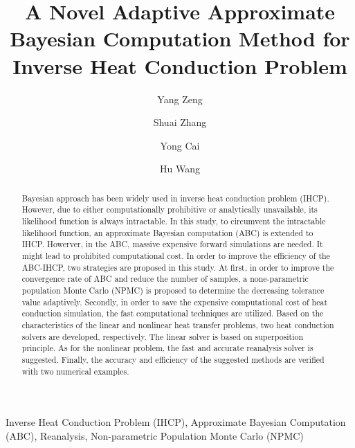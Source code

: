 \documentclass[review]{elsarticle}
\begin{document}
\begin{frontmatter}

\title{A Novel Adaptive Approximate Bayesian Computation Method for Inverse Heat Conduction Problem}

\author[mymainaddress,mysecondaryaddress]{Yang Zeng}

\author[mymainaddress,mysecondaryaddress]{Shuai Zhang}

\author[mymainaddress,mysecondaryaddress]{Yong Cai}

\author[mysecondaryaddress]{Hu Wang}

\address[mymainaddress]{College of Mechanical and Vehicle engineering, Hunan University}
\address[mysecondaryaddress]{State Key Laboratory of Advanced Design and Manufacturing for Vehicle Body}

\begin{abstract}
Bayesian approach has been widely used in inverse heat conduction problem (IHCP). However, due to either computationally prohibitive or analytically unavailable, its likelihood function is always intractable. In this study, to circumvent the intractable likelihood function, an approximate Bayesian computation (ABC) is extended to IHCP. Howerver, in the ABC, massive expensive forward simulations are needed. It might lead to prohibited computational cost. In order to improve the efficiency of the ABC-IHCP, two strategies are proposed in this study. At first, in order to improve the convergence rate of ABC and reduce the number of samples, a none-parametric population Monte Carlo (NPMC) is proposed to determine the decreasing tolerance value adaptively. Secondly, in order to save the expensive computational cost of heat conduction simulation, the fast computational techniques are utilized. Based on the characteristics of the linear and nonlinear heat transfer problems, two heat conduction solvers are developed, respectively. The linear solver is based on superposition principle. As for the nonlinear problem, the fast and accurate reanalysis solver is suggested. Finally, the accuracy and efficiency of the suggested methods are verified with two numerical examples.
\end{abstract}

\begin{keyword}
Inverse Heat Conduction Problem (IHCP), Approximate Bayesian Computation (ABC), Reanalysis, Non-parametric Population Monte Carlo (NPMC)
\end{keyword}

\end{frontmatter}
\end{document}
